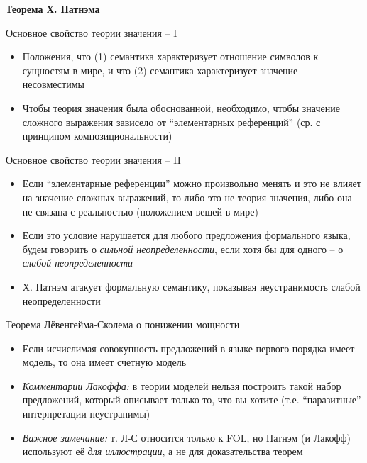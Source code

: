 \documentclass{beamer}
\begin{document}
\begin{frame}{}
\begin{center}
	\textbf{Теорема Х. Патнэма}
\end{center}
\end{frame}

\begin{frame}{Основное свойство теории значения -- I}
\begin{itemize}
	\item Положения, что (1) семантика характеризует отношение символов к сущностям в мире, и что (2) семантика характеризует значение -- несовместимы
	\item Чтобы теория значения была обоснованной, необходимо, чтобы значение сложного выражения зависело от ``элементарных референций'' (ср. с принципом композициональности)
\end{itemize}
\end{frame}

\begin{frame}{Основное свойство теории значения -- II}
\begin{itemize}	
    \item Если ``элементарные референции'' можно произвольно менять и это не влияет на значение сложных выражений, то либо это не теория значения, либо она не связана с реальностью (положением вещей в мире)
	\item Если это условие нарушается для любого предложения формального языка, будем говорить о \textit{сильной неопределенности}, если хотя бы для одного -- о \textit{слабой неопределенности}
	\item Х. Патнэм атакует формальную семантику, показывая неустранимость слабой неопределенности
\end{itemize}
\end{frame}

\begin{frame}{Теорема Лёвенгейма-Сколема о понижении мощности}
\begin{itemize}
	\item[] Если исчислимая совокупность предложений в языке первого порядка имеет модель, то она имеет счетную модель
	\bigskip
	\item \textit{Комментарии Лакоффа:} в теории моделей нельзя построить такой набор предложений, который описывает только то, что вы хотите (т.е. ``паразитные'' интерпретации неустранимы)
	\item \textit{Важное замечание:} т. Л-С относится только к FOL, но Патнэм (и Лакофф) используют её \textit{для иллюстрации}, а не для доказательства теорем
\end{itemize}
\end{frame}
\end{document}
